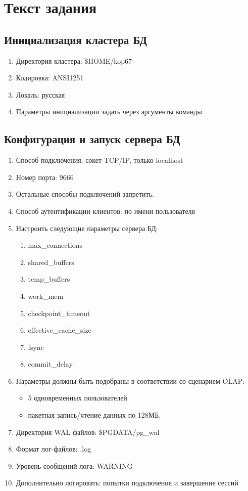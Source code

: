 \documentclass{article}
\begin{document}
\section{Текст задания}

\subsection{Инициализация кластера БД}

\begin{enumerate}
    \item Директория кластера: \$HOME/kop67
    \item Кодировка: ANSI1251
    \item Локаль: русская
    \item Параметры инициализации задать через аргументы команды
\end{enumerate}

\subsection{Конфигурация и запуск сервера БД}

\begin{enumerate}
    \item Способ подключения: сокет TCP/IP, только localhost
    \item Номер порта: 9666
    \item Остальные способы подключений запретить.
    \item Способ аутентификации клиентов: по имени пользователя
    \item Настроить следующие параметры сервера БД:
    \begin{enumerate}
        \item max\_connections
        \item shared\_buffers
        \item temp\_buffers
        \item work\_mem
        \item checkpoint\_timeout
        \item effective\_cache\_size
        \item fsync
        \item commit\_delay
    \end{enumerate}
    \item Параметры должны быть подобраны в соответствии со сценарием OLAP:
    \begin{itemize}
        \item 5 одновременных пользователей
        \item пакетная запись/чтение данных по 128МБ.
    \end{itemize}
    \item Директория WAL файлов: \$PGDATA/pg\_wal
    \item Формат лог-файлов: .log
    \item Уровень сообщений лога: WARNING
    \item Дополнительно логировать: попытки подключения и завершение сессий
\end{enumerate}
\end{document}
